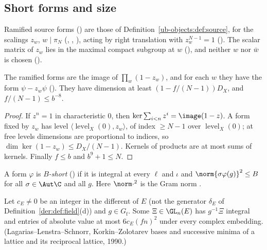 \subsection{Short forms and size}

Ramified source forms () are those of
Definition~\ref{ub-objects:def:source}, for the scalings $z_w$, $w\mid\pi_N$
(, ,
), acting by right translation with $z_w^{N-1}=1$
(). The scalar matrix of $z_w$ lies in the maximal compact subgroup at
$w$ (), and neither $w$ nor $\bar w$ is
chosen ().

\begin{lemma}\label{ub-divis:lem:ram}
The ramified forms are the image of $\prod_w(1-z_w)$, and for each $w$ they have the form
$\psi-z_w\psi$ (). They have dimension at least
$(1-f/(N-1))D_X$, and $f/(N-1)\le b^{-8}$.
\end{lemma}

\begin{proof}
If $z^n=1$ in characteristic $0$, then $\ker\sum_{i<n}z^i=\image(1-z)$. A form fixed by $z_w$ has
level $\langle\operatorname{level}_X(0),z_w\rangle$, of index $\ge N-1$ over $\operatorname{level}_X(0)$; at free levels dimensions are
proportional to indices, so $\dim\ker(1-z_w)\le D_X/(N-1)$. Kernels of products are at most sums of
kernels. Finally $f\le b$ and $b^9+1\le N$.
\end{proof}

A form $\varphi$ is \emph{$B$-short} () if it is integral at every $\ell$ and $\iota$
and $\norm{\sigma\varphi(g)}^2\le B$ for all $\sigma\in\Aut\C$ and all $g$. Here $\norm\cdot^2$ is
the Gram norm .

\begin{fact}\label{ub-divis:fact:short}
Let $c_E\ne0$ be an integer in the different of $E$ (not the generator $\delta_E$ of
Definition~\ref{der:def:field}(d)) and $g\in G_{\mathrm f}$. Some $\Xi\in\GL_n(E)$ has
$g^{-1}\Xi$ integral and entries of absolute value at most $6c_E(fn)^2$ under every complex embedding.
(Lagarias--Lenstra--Schnorr, Korkin--Zolotarev bases and successive minima of a lattice and its
reciprocal lattice, 1990.)
\end{fact}

